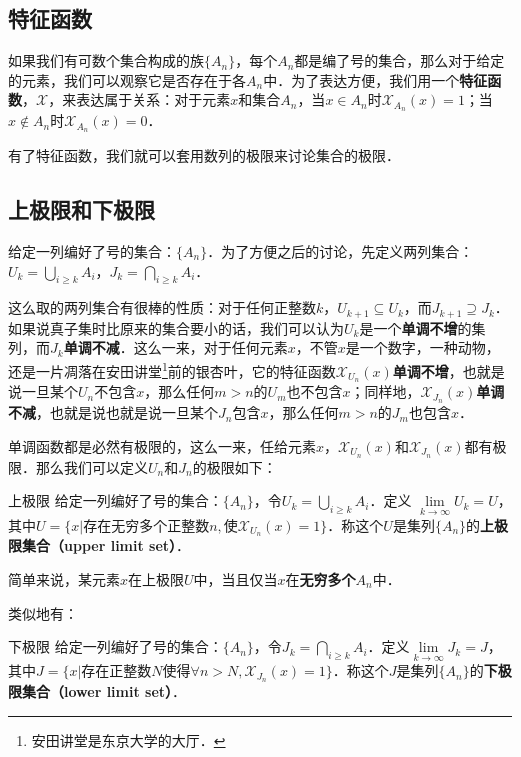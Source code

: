 

\subsection{特征函数}
如果我们有可数个集合构成的族$\{A_n\}$，每个$A_n$都是编了号的集合，那么对于给定的元素，我们可以观察它是否存在于各$A_n$中．为了表达方便，我们用一个\textbf{特征函数}，$\mathcal{X}$，来表达属于关系：对于元素$x$和集合$A_n$，当$x\in A_n$时$\mathcal{X}_{A_n}(x)=1$；当$x\not\in A_n$时$\mathcal{X}_{A_n}(x)=0$．

有了特征函数，我们就可以套用数列的极限来讨论集合的极限．

\subsection{上极限和下极限}
给定一列编好了号的集合：$\{A_n\}$．为了方便之后的讨论，先定义两列集合：$U_k=\underset{i\ge k}{\bigcup}A_i$，$J_k=\underset{i\ge k}{\bigcap} A_i$．

这么取的两列集合有很棒的性质：对于任何正整数$k$，$U_{k+1}\subseteq U_k$，而$J_{k+1}\supseteq J_k$．如果说真子集时比原来的集合要小的话，我们可以认为$U_k$是一个\textbf{单调不增}的集列，而$J_k$\textbf{单调不减}．这么一来，对于任何元素$x$，不管$x$是一个数字，一种动物，还是一片凋落在安田讲堂\footnote{安田讲堂是东京大学的大厅．}前的银杏叶，它的特征函数$\mathcal{X}_{U_n}(x)$\textbf{单调不增}，也就是说一旦某个$U_n$不包含$x$，那么任何$m>n$的$U_m$也不包含$x$；同样地，$\mathcal{X}_{J_n}(x)$\textbf{单调不减}，也就是说也就是说一旦某个$J_n$包含$x$，那么任何$m>n$的$J_m$也包含$x$．

单调函数都是必然有极限的，这么一来，任给元素$x$，$\mathcal{X}_{U_n}(x)$和$\mathcal{X}_{J_n}(x)$都有极限．那么我们可以定义$U_n$和$J_n$的极限如下：

\begin{definition}{上极限}
给定一列编好了号的集合：$\{A_n\}$，令$U_k=\underset{i\ge k}{\bigcup} A_i$．定义 $\lim\limits_{k\to\infty} U_k=U$，其中$U=\{x|\text{存在无穷多个正整数}n,\text{使}\mathcal{X}_{U_n}(x)=1\}$．称这个$U$是集列$\{A_n\}$的\textbf{上极限集合（upper limit set）}．
\end{definition}

简单来说，某元素$x$在上极限$U$中，当且仅当$x$在\textbf{无穷多个}$A_n$中．

类似地有：

\begin{definition}{下极限}
给定一列编好了号的集合：$\{A_n\}$，令$J_k=\underset{i\ge k}{\bigcap} A_i$．定义$\lim\limits_{k\to\infty} J_k=J$，其中$J=\{x|\text{存在正整数}N\text{使得}\forall n>N, \mathcal{X}_{J_n}(x)=1\}$．称这个$J$是集列$\{A_n\}$的\textbf{下极限集合（lower limit set）}．
\end{definition}


